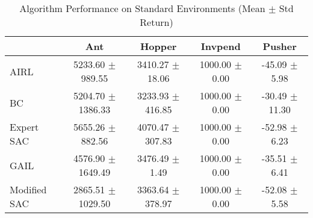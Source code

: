 \begin{table}
\caption{Algorithm Performance on Standard Environments (Mean $\pm$ Std Return)}
\label{tab:perf_standard}
\begin{tabular}{lcccc}
\toprule
 & Ant & Hopper & Invpend & Pusher \\
\midrule
AIRL & 5233.60 $\pm$ 989.55 & 3410.27 $\pm$ 18.06 & 1000.00 $\pm$ 0.00 & -45.09 $\pm$ 5.98 \\
BC & 5204.70 $\pm$ 1386.33 & 3233.93 $\pm$ 416.85 & 1000.00 $\pm$ 0.00 & -30.49 $\pm$ 11.30 \\
Expert SAC & 5655.26 $\pm$ 882.56 & 4070.47 $\pm$ 307.83 & 1000.00 $\pm$ 0.00 & -52.98 $\pm$ 6.23 \\
GAIL & 4576.90 $\pm$ 1649.49 & 3476.49 $\pm$ 1.49 & 1000.00 $\pm$ 0.00 & -35.51 $\pm$ 6.41 \\
Modified SAC & 2865.51 $\pm$ 1029.50 & 3363.64 $\pm$ 378.97 & 1000.00 $\pm$ 0.00 & -52.08 $\pm$ 5.58 \\
\bottomrule
\end{tabular}
\end{table}

